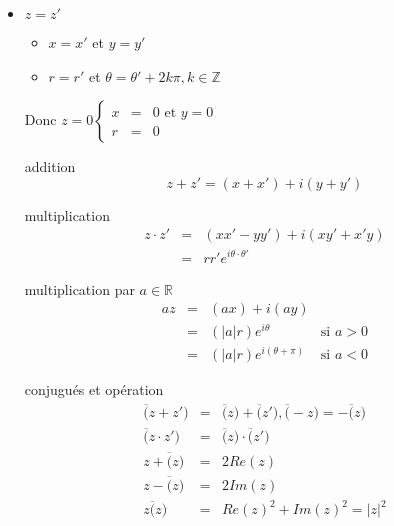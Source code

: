 \begin{itemize}
	\item $z = z'$
		\begin{itemize}
			\item $x = x'$ et $y=y'$
			\item $r=r'$ et $\theta = \theta' + 2k\pi, k \in \mathbb{Z}$
		\end{itemize}
	Donc $z=0 \left\{ \begin{array}{rcl}
					x &=& 0 \text{ et } y = 0\\
					r &=& 0\end{array}\right.$
	
	\item[addition] \[z+z' = (x+x') + i(y+y')\]
	\item[multiplication] \[\begin{array}{rcl}
		z\cdot z' &=& (xx' - yy') + i(xy'+x'y) \\
&=& rr'e^{i\theta \cdot \theta'}\end{array}\]

	\item[multiplication par $a \in \mathbb{R}$]
		\[\begin{array}{rclr}
			az &=& (ax) + i(ay) \\
&=& (|a|r)e^{i\theta} & \text{si } a > 0 \\
&=& (|a|r)e^{i(\theta + \pi)} & \text{si } a < 0 \end{array}\]

	\item[conjugués et opération]
		\[\begin{array}{rcl}
				\overline(z+z') &=& \overline(z) + \overline(z') , \overline(-z) = -\overline(z) \\
				\overline(z\cdot z') &=& \overline(z) \cdot \overline(z') \\
				z+\overline(z) &=& 2Re(z) \\
				z - \overline(z) &=& 2 Im(z) \\
		z\overline(z) &=& Re(z)^2 + Im(z)^2 = |z|^2\end{array}\]
\end{itemize}
